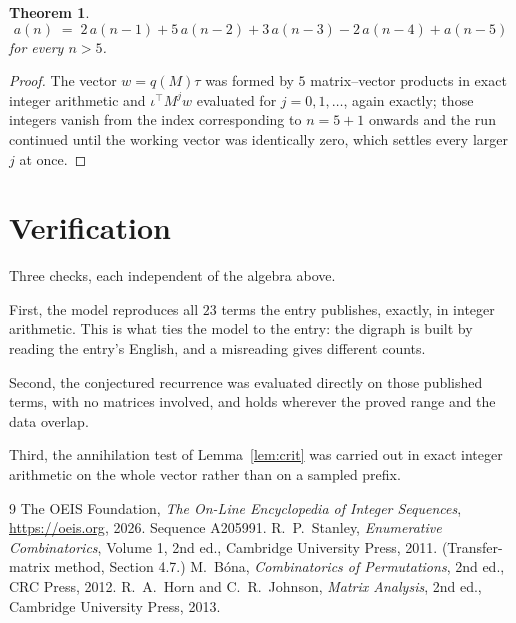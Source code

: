 \documentclass[11pt,a4paper]{article}
\theoremstyle{plain}
\newtheorem{theorem}{Theorem}
\theoremstyle{definition}
\begin{document}
\begin{theorem}
\[
a(n)\;=\;2\,a(n-1) + 5\,a(n-2) + 3\,a(n-3) - 2\,a(n-4) + a(n-5)
\]
for every $n>5$.
\end{theorem}

\begin{proof}
The vector $w=q(M)\tau$ was formed by $5$ matrix--vector products in exact integer
arithmetic and $\iota^{\!\top}M^{j}w$ evaluated for $j=0,1,\dots$, again exactly; those
integers vanish from the index corresponding to $n=5+1$ onwards and the run continued
until the working vector was identically zero, which settles every larger $j$ at once.
\end{proof}

\section{Verification}

Three checks, each independent of the algebra above.

First, the model reproduces all $23$ terms the entry publishes, exactly, in integer
arithmetic. This is what ties the model to the entry: the digraph is built by reading the
entry's English, and a misreading gives different counts.

Second, the conjectured recurrence was evaluated directly on those published terms, with no
matrices involved, and holds wherever the proved range and the data overlap.

Third, the annihilation test of Lemma~\ref{lem:crit} was carried out in exact integer
arithmetic on the whole vector rather than on a sampled prefix.

\begin{thebibliography}{9}
 The OEIS Foundation, \emph{The On-Line Encyclopedia of Integer
Sequences}, \url{https://oeis.org}, 2026. Sequence A205991.
 R.~P.~Stanley, \emph{Enumerative Combinatorics}, Volume 1, 2nd ed.,
Cambridge University Press, 2011. (Transfer-matrix method, Section 4.7.)
 M.~B\'ona, \emph{Combinatorics of Permutations}, 2nd ed., CRC
Press, 2012.
 R.~A.~Horn and C.~R.~Johnson, \emph{Matrix Analysis}, 2nd ed., Cambridge
University Press, 2013.
\end{thebibliography}
\end{document}
